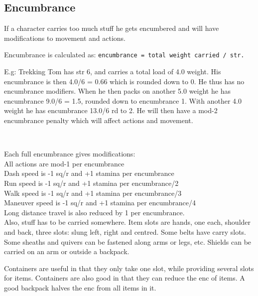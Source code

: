 



\subsection*{Encumbrance}
If a character carries too much stuff he gets encumbered and will have modifications to movement and actions.

\noindent 
Encumbrance is calculated as: \verb|encumbrance = total weight carried / str.|

E.g: Trekking Tom has str 6, and carries a total load of 4.0 weight. His encumbrance is then 4.0/6 = 0.66 which is rounded down to 0. He thus has no encumbrance modifiers. When he then packs on another 5.0 weight he has encumbrance 9.0/6 = 1.5, rounded down to encumbrance 1. With another 4.0 weight he has encumbrance 13.0/6 rd to 2. He will then have a mod-2 encumbrance penalty which will affect actions and movement.

\

\noindent
Each full encumbrance gives modifications: \\
All actions are mod-1 per encumbrance \\
Dash speed is -1 sq/r and +1 stamina per encumbrance \\
Run speed is -1 sq/r and +1 stamina per encumbrance/2 \\
Walk speed is -1 sq/r and +1 stamina per encumbrance/3 \\
Maneuver speed is -1 sq/r and +1 stamina per encumbrance/4 \\
Long distance travel is also reduced by 1 per encumbrance. \\

Also, stuff has to be carried somewhere. Item slots are hands, one each, shoulder and back, three slots: slung left, right and centred. Some belts have carry slots. Some sheaths and quivers can be fastened along arms or legs, etc. Shields can be carried on an arm or outside a backpack.

Containers are useful in that they only take one slot, while providing several slots for items. Containers are also good in that they can reduce the enc of items. A good backpack halves the enc from all items in it.

